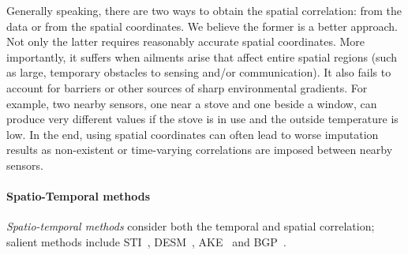 Generally speaking, there are two ways to obtain the spatial correlation:
from the data or from the spatial coordinates.
We believe the former is a better approach. 
Not only the latter requires reasonably accurate spatial coordinates.
More importantly, it suffers when ailments arise that affect entire
spatial regions (such as large, temporary obstacles to sensing and/or communication).
It also fails to account for barriers or other
sources of sharp environmental gradients.
For example, two nearby sensors, one near a stove and one beside a window, can produce very different values if the stove is in use and the outside temperature is low.
In the end, using spatial coordinates can often lead to worse imputation results
as non-existent or time-varying correlations are imposed between nearby sensors.





\paragraph{Spatio-Temporal methods}
{\em Spatio-temporal methods} consider both the
temporal and spatial correlation; salient methods include
STI~\cite{Jian-Zhong:STI}, DESM~\cite{li2008data}, 
AKE~\cite{pan2010k} and BGP~\cite{Osborne2011}. %

